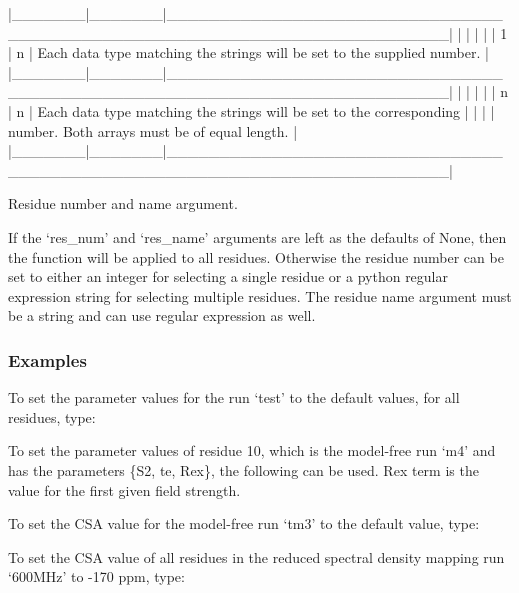 |\_\_\_\_\_\_\_|\_\_\_\_\_\_\_|\_\_\_\_\_\_\_\_\_\_\_\_\_\_\_\_\_\_\_\_\_\_\_\_\_\_\_\_\_\_\_\_\_\_\_\_\_\_\_\_\_\_\_\_\_\_\_\_\_\_\_\_\_\_\_\_\_\_\_\_\_\_\_\_\_\_\_\_\_\_\_\_\_\_|
|       |       |                                                                          |
|   1   |   n   | Each data type matching the strings will be set to the supplied number.  |
|\_\_\_\_\_\_\_|\_\_\_\_\_\_\_|\_\_\_\_\_\_\_\_\_\_\_\_\_\_\_\_\_\_\_\_\_\_\_\_\_\_\_\_\_\_\_\_\_\_\_\_\_\_\_\_\_\_\_\_\_\_\_\_\_\_\_\_\_\_\_\_\_\_\_\_\_\_\_\_\_\_\_\_\_\_\_\_\_\_|
|       |       |                                                                          |
|   n   |   n   | Each data type matching the strings will be set to the corresponding     |
|       |       | number.  Both arrays must be of equal length.                            |
|\_\_\_\_\_\_\_|\_\_\_\_\_\_\_|\_\_\_\_\_\_\_\_\_\_\_\_\_\_\_\_\_\_\_\_\_\_\_\_\_\_\_\_\_\_\_\_\_\_\_\_\_\_\_\_\_\_\_\_\_\_\_\_\_\_\_\_\_\_\_\_\_\_\_\_\_\_\_\_\_\_\_\_\_\_\_\_\_\_|


Residue number and name argument.

If the `res\_num' and `res\_name' arguments are left as the defaults of None, then the
function will be applied to all residues.  Otherwise the residue number can be set to either
an integer for selecting a single residue or a python regular expression string for
selecting multiple residues.  The residue name argument must be a string and can use regular
expression as well.


\subsubsection{Examples}

To set the parameter values for the run `test' to the default values, for all residues,
type:


To set the parameter values of residue 10, which is the model-free run `m4' and has the
parameters \{S2, te, Rex\}, the following can be used.  Rex term is the value for the first
given field strength.



To set the CSA value for the model-free run `tm3' to the default value, type:


To set the CSA value of all residues in the reduced spectral density mapping run `600MHz' to
-170 ppm, type:

